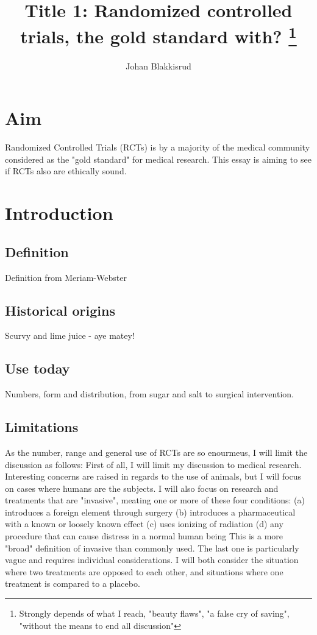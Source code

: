 \documentclass[12p]{article}
\title{Title 1: Randomized controlled trials, the gold standard with?
  \footnote{Strongly depends of what I reach, "beauty flaws", "a false cry of saving", "without the means to end all discussion"}
}
\author{Johan Blakkisrud}
\begin{document}
\maketitle

\section*{Aim}

Randomized Controlled Trials (RCTs) is by a majority of the medical community considered as the "gold standard" for medical research.
This essay is aiming to see if RCTs also are ethically sound.

\section*{Introduction}

\subsection*{Definition}

Definition from Meriam-Webster
\subsection*{Historical origins}
Scurvy and lime juice - aye matey!
\subsection*{Use today}
Numbers, form and distribution, from sugar and salt to surgical intervention.
\subsection*{Limitations}
As the number, range and general use of RCTs are so enourmeus, I will limit the discussion as follows:
First of all, I will limit my discussion to medical research.
Interesting concerns are raised in regards to the use of animals, but I will focus on cases where humans are the subjects.
I will also focus on research and treatments that are "invasive", meating one or more of these four conditions:
(a) introduces a foreign element through surgery 
(b) introduces a pharmaceutical with a known or loosely known effect
(c) uses ionizing of radiation
(d) any procedure that can cause distress in a normal human being
This is a more "broad" definition of invasive than commonly used.
The last one is particularly vague and requires individual considerations.
I will both consider the situation where two treatments are opposed to each other, and situations where one treatment is compared to a placebo.
\end{document}
